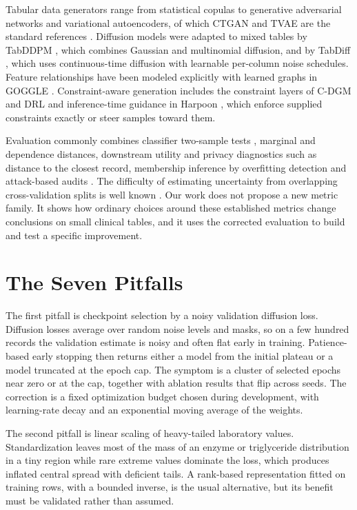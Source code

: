 \documentclass[conference]{IEEEtran}
\begin{document}
Tabular data generators range from statistical copulas to generative adversarial networks and variational autoencoders, of which CTGAN and TVAE are the standard references \cite{xu2019ctgan}. Diffusion models \cite{ho2020ddpm,austin2021d3pm} were adapted to mixed tables by TabDDPM \cite{kotelnikov2023tabddpm}, which combines Gaussian and multinomial diffusion, and by TabDiff \cite{shi2025tabdiff}, which uses continuous-time diffusion with learnable per-column noise schedules. Feature relationships have been modeled explicitly with learned graphs in GOGGLE \cite{liu2023goggle}. Constraint-aware generation includes the constraint layers of C-DGM \cite{stoian2024cdgm} and DRL \cite{stoian2025drl} and inference-time guidance in Harpoon \cite{shankar2026harpoon}, which enforce supplied constraints exactly or steer samples toward them.

Evaluation commonly combines classifier two-sample tests \cite{lopezpaz2017c2st}, marginal and dependence distances, downstream utility and privacy diagnostics such as distance to the closest record, membership inference by overfitting detection \cite{vanbreugel2023domias} and attack-based audits \cite{giomi2023anonymeter}. The difficulty of estimating uncertainty from overlapping cross-validation splits is well known \cite{bengio2004variance}. Our work does not propose a new metric family. It shows how ordinary choices around these established metrics change conclusions on small clinical tables, and it uses the corrected evaluation to build and test a specific improvement.

\section{The Seven Pitfalls}

The first pitfall is checkpoint selection by a noisy validation diffusion loss. Diffusion losses average over random noise levels and masks, so on a few hundred records the validation estimate is noisy and often flat early in training. Patience-based early stopping then returns either a model from the initial plateau or a model truncated at the epoch cap. The symptom is a cluster of selected epochs near zero or at the cap, together with ablation results that flip across seeds. The correction is a fixed optimization budget chosen during development, with learning-rate decay and an exponential moving average of the weights.

The second pitfall is linear scaling of heavy-tailed laboratory values. Standardization leaves most of the mass of an enzyme or triglyceride distribution in a tiny region while rare extreme values dominate the loss, which produces inflated central spread with deficient tails. A rank-based representation fitted on training rows, with a bounded inverse, is the usual alternative, but its benefit must be validated rather than assumed.
\end{document}
